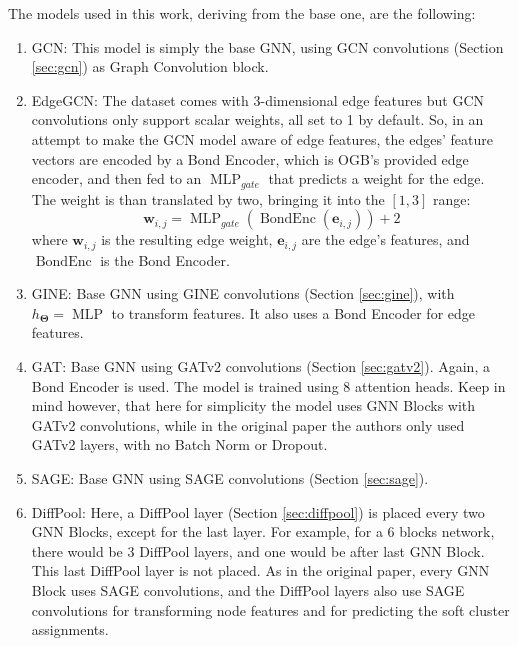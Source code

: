 \documentclass[journal]{IEEEtran}
\begin{document}
The models used in this work, deriving from the base one, are the following:
\begin{enumerate}
    \item GCN: This model is simply the base GNN, using GCN convolutions \cite{kipf2016gcn} (Section \ref{sec:gcn}) as Graph Convolution block.
    \item EdgeGCN: The dataset comes with 3-dimensional edge features but GCN convolutions only support scalar weights, all set to 1 by default. So, in an attempt to make the GCN model aware of edge features, the edges' feature vectors are encoded by a Bond Encoder, which is OGB's provided edge encoder, and then fed to an $\operatorname{MLP}_{gate}$ that predicts a weight for the edge. The weight is than translated by two, bringing it into the $[1,3]$ range:
    \begin{equation}
        \mathbf{w}_{i,j} = \operatorname{MLP}_{gate}(\operatorname{BondEnc}(\mathbf{e}_{i,j})) + 2
    \end{equation}
    where $\mathbf{w}_{i,j}$ is the resulting edge weight, $\mathbf{e}_{i,j}$ are the edge's features, and $\operatorname{BondEnc}$ is the Bond Encoder.
    \item GINE: Base GNN using GINE convolutions \cite{hu2019gine} (Section \ref{sec:gine}), with $h_{\mathbf{\Theta}} = \operatorname{MLP}$ to transform features. It also uses a Bond Encoder for edge features.
    \item GAT: Base GNN using GATv2 convolutions \cite{brody2021gatv2} (Section \ref{sec:gatv2}). Again, a Bond Encoder is used. The model is trained using 8 attention heads. Keep in mind however, that here for simplicity the model uses GNN Blocks with GATv2 convolutions, while in the original paper the authors only used GATv2 layers, with no Batch Norm or Dropout.
    \item SAGE: Base GNN using SAGE convolutions \cite{hamilton2017sage} (Section \ref{sec:sage}).
    \item DiffPool: Here, a DiffPool layer \cite{ying2018diffpool} (Section \ref{sec:diffpool}) is placed every two GNN Blocks, except for the last layer. For example, for a 6 blocks network, there would be 3 DiffPool layers, and one would be after last GNN Block. This last DiffPool layer is not placed. As in the original paper, every GNN Block uses SAGE convolutions, and the DiffPool layers also use SAGE convolutions for transforming node features and for predicting the soft cluster assignments.
\end{enumerate}
\end{document}
